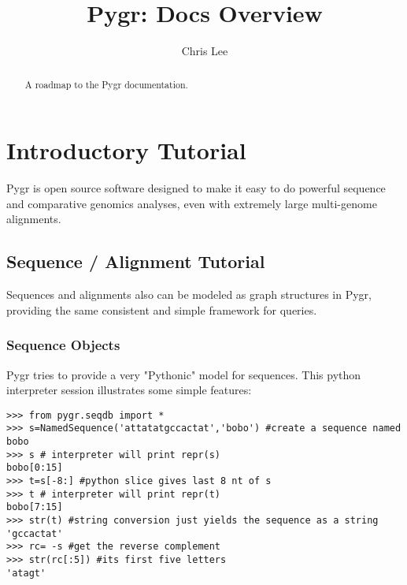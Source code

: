 \documentclass{howto}
\title{Pygr: Docs Overview}
\author{Chris Lee}
\begin{document}
\maketitle

\begin{abstract}
  \noindent
   A roadmap to the Pygr documentation.
\end{abstract}



%
\tableofcontents


\section{Introductory Tutorial}
\label{intro}

Pygr is open source software designed to make it easy to do powerful sequence and
comparative genomics analyses, even with extremely large multi-genome alignments.


\subsection{Sequence / Alignment Tutorial}
\label{seq-align}

Sequences and alignments also can be modeled as graph structures in Pygr, providing the same consistent and simple framework for queries.

\subsubsection{Sequence Objects}
Pygr tries to provide a very "Pythonic" model for sequences.  This python interpreter session illustrates some simple features:

\begin{verbatim}
>>> from pygr.seqdb import *
>>> s=NamedSequence('attatatgccactat','bobo') #create a sequence named bobo
>>> s # interpreter will print repr(s)
bobo[0:15]
>>> t=s[-8:] #python slice gives last 8 nt of s
>>> t # interpreter will print repr(t)
bobo[7:15]
>>> str(t) #string conversion just yields the sequence as a string 
'gccactat'
>>> rc= -s #get the reverse complement
>>> str(rc[:5]) #its first five letters
'atagt'
\end{verbatim}
\end{document}

